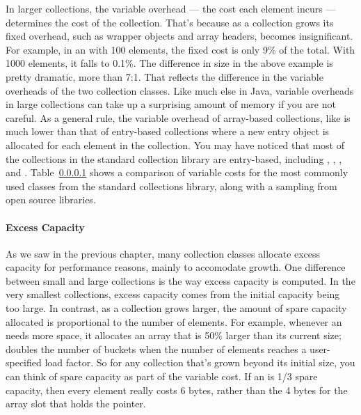 In larger collections, the variable overhead --- the cost each element incurs
--- determines the cost of the collection. That's because as a collection grows its fixed overhead,
such as wrapper objects and array headers, becomes insignificant. For example,
in an  with 100 elements, the fixed cost is only 9\% of the total. With 1000
elements, it falls to 0.1\%.  The difference in size in the above example is
pretty dramatic, more than 7:1.  That reflects the difference in the variable overheads of the two
collection classes. Like much else in Java, variable overheads in large
collections can take up a surprising amount of memory if you are not careful.
As a general rule,
the variable overhead of array-based collections, like  is much lower than that of 
entry-based collections where a new entry
object is allocated for each element in the collection. You may have noticed
that most of the collections in the standard collection library are entry-based,
including , , , and . Table~\ref{} shows a
comparison of variable costs for the most commonly used classes from the standard collections library, 
along with a sampling from open source libraries.



\paragraph{Excess Capacity}

As we saw in the previous chapter, many collection
classes allocate excess capacity for performance reasons, mainly to accomodate
growth. One difference between small and large collections is the way
excess capacity is computed.  In the very smallest collections, excess capacity
comes from the initial capacity being too large. In contrast, as a collection
grows larger, the amount of spare capacity allocated is proportional to the
number of elements. For example, whenever an  needs
more space, it allocates an array that is 50\% larger than its current
size;  doubles the number of buckets when the number
of elements reaches a user-specified load factor. So for any collection that's
grown beyond its initial size, you can 
think of spare capacity as part of the variable cost.
If an  is 1/3 spare capacity, then every
element really costs 6 bytes, rather than the 4 bytes for the array slot that
holds the pointer.

